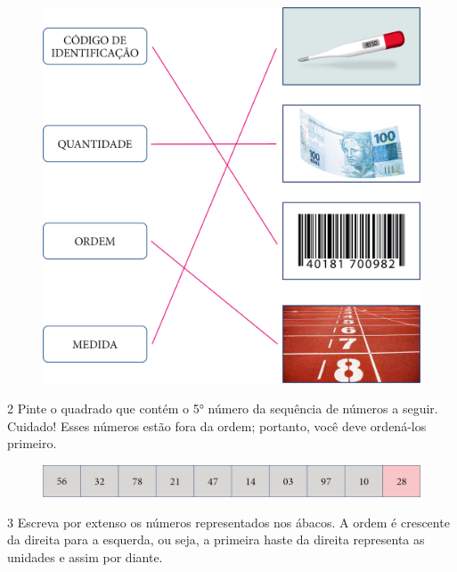 \begin{figure}[htpb!]
\centering
\includegraphics[width=.8\textwidth]{./media/image3.png}
\end{figure}


\num{2} Pinte o quadrado que contém o 5° número da sequência de números a seguir.
Cuidado! Esses números estão fora da ordem; portanto, você deve
ordená-los primeiro.

\begin{figure}[htpb!]
\includegraphics[width=\textwidth]{./media/image4.png}
\end{figure}

\pagebreak
\num{3} Escreva por extenso os números representados nos ábacos. A ordem
é crescente da direita para a esquerda, ou seja, a primeira haste da
direita representa as unidades e assim por diante.

